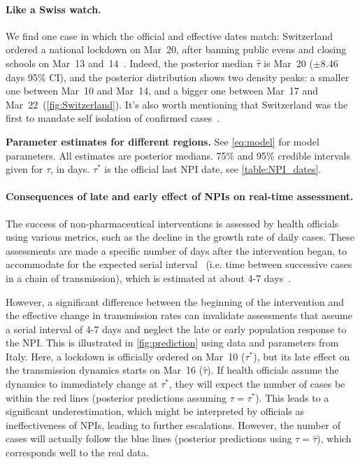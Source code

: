 \documentclass[12pt]{extarticle}
\begin{document}
\paragraph*{Like a Swiss watch.}
We find one case in which the official and effective dates match: Switzerland ordered a national lockdown on Mar~20, after banning public evens and closing schools on Mar~13 and~14~\citep{Flaxman2020}.
Indeed, the posterior median $\hat{\tau}$ is Mar~20 ($\pm$8.46 days 95\% CI), and the posterior distribution shows two density peaks: a smaller one between Mar~10 and Mar~14, and a bigger one between Mar~17 and Mar~22~(\autoref{fig:Switzerland}). It's also worth mentioning that Switzerland was the first to mandate self isolation of confirmed cases~\citep{Flaxman2020}.



\begin{landscape}
\begin{table}[h]
\centering

\caption{
\textbf{Parameter estimates for different regions.}
See \autoref{eq:model} for model parameters.
All estimates are posterior medians.
75\% and 95\% credible intervals given for $\tau$, in days.
$\tau^*$ is the official last NPI date, see \autoref{table:NPI_dates}.
}
\label{table:estimated-params}
\end{table}
\end{landscape}



\paragraph*{Consequences of late and early effect of NPIs on real-time assessment.}

The success of non-pharmaceutical interventions is assessed by health officials using various metrics, such as the decline in the growth rate of daily cases. These assessments are made a specific number of days after the intervention began, to accommodate for the expected serial interval~\citep{Banholzer2020} (i.e. time between successive cases in a chain of transmission), which is estimated at about 4-7 days~\citep{Gatto2020}. %

However, a significant difference between the beginning of the intervention and the effective change in transmission rates can invalidate assessments that assume a serial interval of 4-7 days and neglect the late or early population response to the NPI.
This is illustrated in \autoref{fig:prediction} using data and parameters from Italy.
Here, a lockdown is officially ordered on Mar~10 ($\tau^*$), but its late effect on the transmission dynamics starts on Mar~16 ($\hat{\tau}$). If health officials assume the dynamics to immediately change at $\tau^*$, they will expect the number of cases be within the red lines (posterior predictions assuming $\tau=\tau^*$).
This leads to a significant underestimation, which might be interpreted by officials as ineffectiveness of NPIs, leading to further escalations.
However, the number of cases will actually follow the blue lines (posterior predictions using $\tau=\hat{\tau}$), which corresponds well to the real data.
\end{document}
